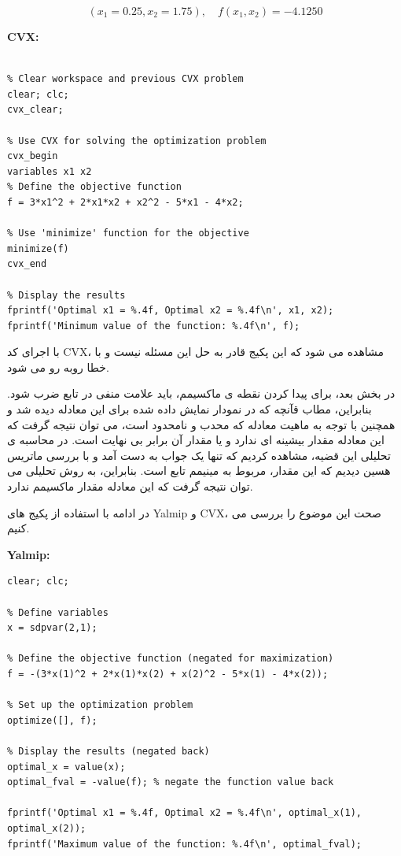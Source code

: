 \[
(x_1 = 0.25, x_2 = 1.75) , \quad f(x_1, x_2) = -4.1250
\]

\textbf{CVX:}

\begin{latin}
	\begin{lstlisting}[frame=single,style=Matlab-Pyglike]
		
% Clear workspace and previous CVX problem
clear; clc;
cvx_clear;

% Use CVX for solving the optimization problem
cvx_begin
variables x1 x2
% Define the objective function
f = 3*x1^2 + 2*x1*x2 + x2^2 - 5*x1 - 4*x2;

% Use 'minimize' function for the objective
minimize(f)
cvx_end

% Display the results
fprintf('Optimal x1 = %.4f, Optimal x2 = %.4f\n', x1, x2);
fprintf('Minimum value of the function: %.4f\n', f);

	\end{lstlisting}
\end{latin}

با اجرای کد CVX، مشاهده می شود که این پکیج قادر به حل این مسئله نیست و با خطا روبه رو می شود.

در بخش بعد، برای پیدا کردن نقطه ی ماکسیمم، باید علامت منفی در تابع ضرب شود. بنابراین، مطاب قآنچه که در نمودار نمایش داده شده برای این معادله دیده شد و همچنین با توجه به ماهیت معادله که محدب و نامحدود است، می توان نتیجه گرفت که این معادله مقدار بیشینه ای ندارد و یا مقدار آن برابر بی نهایت است. 
در محاسبه ی تحلیلی این قضیه، مشاهده کردیم که تنها یک جواب به دست آمد و با بررسی ماتریس هسین دیدیم که این مقدار، مربوط به مینیمم تابع است. بنابراین، به روش تحلیلی می توان نتیجه گرفت که این معادله مقدار ماکسیمم ندارد.

در ادامه با استفاده از پکیج های Yalmip و CVX، صحت این موضوع را بررسی می کنیم.

\textbf{Yalmip:}
\begin{latin}
	\begin{lstlisting}[frame=single,style=Matlab-Pyglike]
% Clear workspace
clear; clc;

% Define variables
x = sdpvar(2,1);

% Define the objective function (negated for maximization)
f = -(3*x(1)^2 + 2*x(1)*x(2) + x(2)^2 - 5*x(1) - 4*x(2));

% Set up the optimization problem
optimize([], f);

% Display the results (negated back)
optimal_x = value(x);
optimal_fval = -value(f); % negate the function value back

fprintf('Optimal x1 = %.4f, Optimal x2 = %.4f\n', optimal_x(1), optimal_x(2));
fprintf('Maximum value of the function: %.4f\n', optimal_fval);
	\end{lstlisting}
\end{latin}

